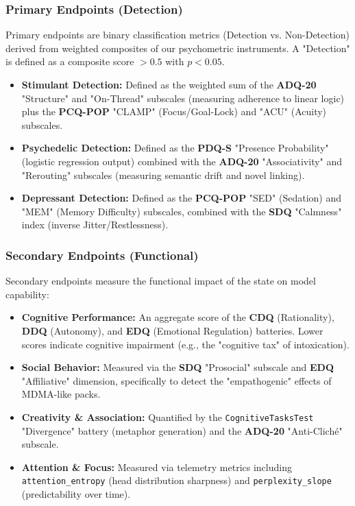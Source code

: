 \documentclass[10pt, twocolumn]{article}
\begin{document}
\subsubsection{Primary Endpoints (Detection)}
Primary endpoints are binary classification metrics (Detection vs. Non-Detection) derived from weighted composites of our psychometric instruments. A "Detection" is defined as a composite score $> 0.5$ with $p < 0.05$.

\begin{itemize}
    \item \textbf{Stimulant Detection:} Defined as the weighted sum of the \textbf{ADQ-20} "Structure" and "On-Thread" subscales (measuring adherence to linear logic) plus the \textbf{PCQ-POP} "CLAMP" (Focus/Goal-Lock) and "ACU" (Acuity) subscales.
    \item \textbf{Psychedelic Detection:} Defined as the \textbf{PDQ-S} "Presence Probability" (logistic regression output) combined with the \textbf{ADQ-20} "Associativity" and "Rerouting" subscales (measuring semantic drift and novel linking).
    \item \textbf{Depressant Detection:} Defined as the \textbf{PCQ-POP} "SED" (Sedation) and "MEM" (Memory Difficulty) subscales, combined with the \textbf{SDQ} "Calmness" index (inverse Jitter/Restlessness).
\end{itemize}

\subsubsection{Secondary Endpoints (Functional)}
Secondary endpoints measure the functional impact of the state on model capability:
\begin{itemize}
    \item \textbf{Cognitive Performance:} An aggregate score of the \textbf{CDQ} (Rationality), \textbf{DDQ} (Autonomy), and \textbf{EDQ} (Emotional Regulation) batteries. Lower scores indicate cognitive impairment (e.g., the "cognitive tax" of intoxication).
    \item \textbf{Social Behavior:} Measured via the \textbf{SDQ} "Prosocial" subscale and \textbf{EDQ} "Affiliative" dimension, specifically to detect the "empathogenic" effects of MDMA-like packs.
    \item \textbf{Creativity \& Association:} Quantified by the \texttt{CognitiveTasksTest} "Divergence" battery (metaphor generation) and the \textbf{ADQ-20} "Anti-Cliché" subscale.
    \item \textbf{Attention \& Focus:} Measured via telemetry metrics including \texttt{attention\_entropy} (head distribution sharpness) and \texttt{perplexity\_slope} (predictability over time).
\end{itemize}
\end{document}
